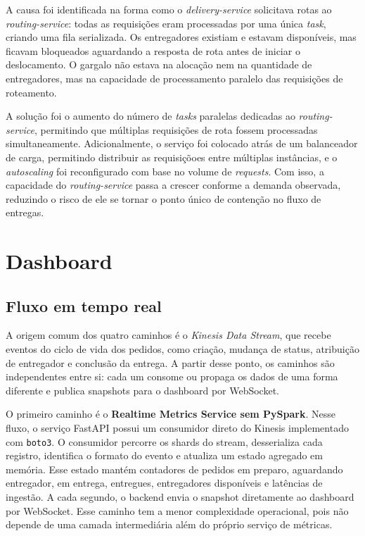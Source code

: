﻿\documentclass{article}
\begin{document}
A causa foi identificada na forma como o \textit{delivery-service} solicitava rotas ao \textit{routing-service}: todas as requisições eram processadas por uma única \textit{task}, criando uma fila serializada. Os entregadores existiam e estavam disponíveis, mas ficavam bloqueados aguardando a resposta de rota antes de iniciar o deslocamento. O gargalo não estava na alocação nem na quantidade de entregadores, mas na capacidade de processamento paralelo das requisições de roteamento.

A solução foi o aumento do número de \textit{tasks} paralelas dedicadas ao \textit{routing-service}, permitindo que múltiplas requisições de rota fossem processadas simultaneamente. Adicionalmente, o serviço foi colocado atrás de um balanceador de carga, permitindo distribuir as requisiçõoes entre múltiplas instâncias, e o \textit{autoscaling} foi reconfigurado com base no volume de \textit{requests}. Com isso, a capacidade do \textit{routing-service} passa a crescer conforme a demanda observada, reduzindo o risco de ele se tornar o ponto único de contenção no fluxo de entregas.

\section{Dashboard}
\subsection{Fluxo em tempo real}

A origem comum dos quatro caminhos é o \textit{Kinesis Data Stream}, que recebe eventos do ciclo de vida dos pedidos, como criação, mudança de status, atribuição de entregador e conclusão da entrega. A partir desse ponto, os caminhos são independentes entre si: cada um consome ou propaga os dados de uma forma diferente e publica snapshots para o dashboard por WebSocket.

O primeiro caminho é o \textbf{Realtime Metrics Service sem PySpark}. Nesse fluxo, o serviço FastAPI possui um consumidor direto do Kinesis implementado com \texttt{boto3}. O consumidor percorre os shards do stream, desserializa cada registro, identifica o formato do evento e atualiza um estado agregado em memória. Esse estado mantém contadores de pedidos em preparo, aguardando entregador, em entrega, entregues, entregadores disponíveis e latências de ingestão. A cada segundo, o backend envia o snapshot diretamente ao dashboard por WebSocket. Esse caminho tem a menor complexidade operacional, pois não depende de uma camada intermediária além do próprio serviço de métricas.
\end{document}
